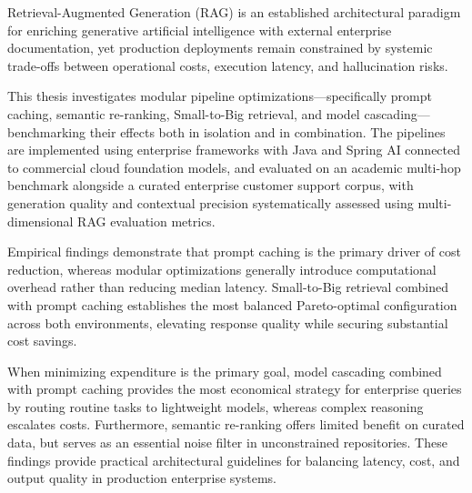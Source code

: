 
\begin{abstractpage}[english]
Retrieval-Augmented Generation (RAG) is an established architectural paradigm for enriching generative artificial intelligence with external enterprise documentation, yet production deployments remain constrained by systemic trade-offs between operational costs, execution latency, and hallucination risks. 

This thesis investigates modular pipeline optimizations---specifically prompt caching, semantic re-ranking, Small-to-Big retrieval, and model cascading---benchmarking their effects both in isolation and in combination. The pipelines are implemented using enterprise frameworks with Java and Spring AI connected to commercial cloud foundation models, and evaluated on an academic multi-hop benchmark alongside a curated enterprise customer support corpus, with generation quality and contextual precision systematically assessed using multi-dimensional RAG evaluation metrics.

Empirical findings demonstrate that prompt caching is the primary driver of cost reduction, whereas modular optimizations generally introduce computational overhead rather than reducing median latency. Small-to-Big retrieval combined with prompt caching establishes the most balanced Pareto-optimal configuration across both environments, elevating response quality while securing substantial cost savings. 

When minimizing expenditure is the primary goal, model cascading combined with prompt caching provides the most economical strategy for enterprise queries by routing routine tasks to lightweight models, whereas complex reasoning escalates costs. Furthermore, semantic re-ranking offers limited benefit on curated data, but serves as an essential noise filter in unconstrained repositories. These findings provide practical architectural guidelines for balancing latency, cost, and output quality in production enterprise systems.
\end{abstractpage}

